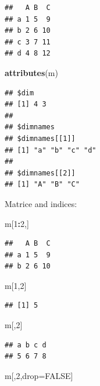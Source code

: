 \documentclass[12pt,]{book}
\newenvironment{Shaded}{\begin{snugshade}}{\end{snugshade}}
\newcommand{\DecValTok}[1]{\textcolor[rgb]{0.00,0.00,0.81}{#1}}
\newcommand{\KeywordTok}[1]{\textcolor[rgb]{0.13,0.29,0.53}{\textbf{#1}}}
\newcommand{\NormalTok}[1]{#1}
\newcommand{\OperatorTok}[1]{\textcolor[rgb]{0.81,0.36,0.00}{\textbf{#1}}}
\newcommand{\OtherTok}[1]{\textcolor[rgb]{0.56,0.35,0.01}{#1}}
\begin{document}
\begin{verbatim}
##   A B  C
## a 1 5  9
## b 2 6 10
## c 3 7 11
## d 4 8 12
\end{verbatim}

\begin{Shaded}
\begin{Highlighting}[]
\KeywordTok{attributes}\NormalTok{(m)}
\end{Highlighting}
\end{Shaded}

\begin{verbatim}
## $dim
## [1] 4 3
## 
## $dimnames
## $dimnames[[1]]
## [1] "a" "b" "c" "d"
## 
## $dimnames[[2]]
## [1] "A" "B" "C"
\end{verbatim}

Matrice and indices:

\begin{Shaded}
\begin{Highlighting}[]
\NormalTok{m[}\DecValTok{1}\OperatorTok{:}\DecValTok{2}\NormalTok{,]}
\end{Highlighting}
\end{Shaded}

\begin{verbatim}
##   A B  C
## a 1 5  9
## b 2 6 10
\end{verbatim}

\begin{Shaded}
\begin{Highlighting}[]
\NormalTok{m[}\DecValTok{1}\NormalTok{,}\DecValTok{2}\NormalTok{]}
\end{Highlighting}
\end{Shaded}

\begin{verbatim}
## [1] 5
\end{verbatim}

\begin{Shaded}
\begin{Highlighting}[]
\NormalTok{m[,}\DecValTok{2}\NormalTok{]}
\end{Highlighting}
\end{Shaded}

\begin{verbatim}
## a b c d 
## 5 6 7 8
\end{verbatim}

\begin{Shaded}
\begin{Highlighting}[]
\NormalTok{m[,}\DecValTok{2}\NormalTok{,drop=}\OtherTok{FALSE}\NormalTok{]}
\end{Highlighting}
\end{Shaded}
\end{document}
